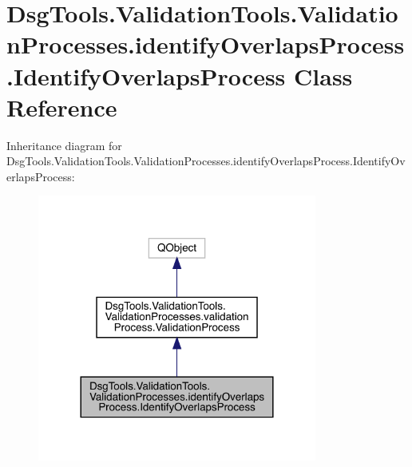\hypertarget{class_dsg_tools_1_1_validation_tools_1_1_validation_processes_1_1identify_overlaps_process_1_1_identify_overlaps_process}{}\section{Dsg\+Tools.\+Validation\+Tools.\+Validation\+Processes.\+identify\+Overlaps\+Process.\+Identify\+Overlaps\+Process Class Reference}
\label{class_dsg_tools_1_1_validation_tools_1_1_validation_processes_1_1identify_overlaps_process_1_1_identify_overlaps_process}


Inheritance diagram for Dsg\+Tools.\+Validation\+Tools.\+Validation\+Processes.\+identify\+Overlaps\+Process.\+Identify\+Overlaps\+Process\+:
\nopagebreak
\begin{figure}[H]
\begin{center}
\leavevmode
\includegraphics[width=260pt]{class_dsg_tools_1_1_validation_tools_1_1_validation_processes_1_1identify_overlaps_process_1_1_i52d801a620e6ab2a15842d2e5de1ee76}
\end{center}
\end{figure}


